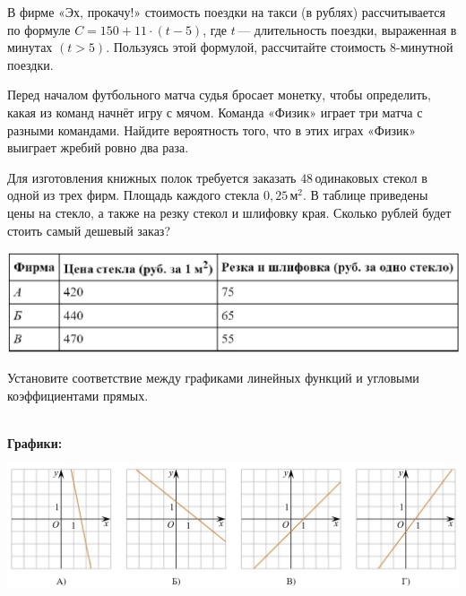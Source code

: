 \begin{training}[1]
\begin{listofex}
\begin{minipage}[t]{\linewidth}
	\end{minipage}
	\item В фирме «Эх, прокачу!» стоимость поездки на такси (в рублях) рассчитывается по формуле \(C=150+11\cdot (t-5)\), где \(t\) --- длительность поездки, выраженная в минутах \((t>5)\). Пользуясь этой формулой, рассчитайте стоимость \(8\)-минутной поездки.
	\item Перед началом футбольного матча судья бросает монетку, чтобы определить, какая из команд начнёт игру с мячом. Команда «Физик» играет три матча с разными командами. Найдите вероятность того, что в этих играх «Физик» выиграет жребий ровно два раза.
	\item 
	\begin{minipage}[t]{\linewidth}
		Для изготовления книжных полок требуется заказать \(48\) одинаковых стекол в одной из трех фирм. Площадь каждого стекла \(0,25\) м\(^2\). В таблице приведены цены на стекло, а также на резку стекол и шлифовку края. Сколько рублей будет стоить самый дешевый заказ?
	\end{minipage}
	\hspace{0.02\linewidth}
	\begin{minipage}[t]{\linewidth}
		\includegraphics[align=t, width=\linewidth]{../pics/G101M8H3-6}
	\end{minipage}
	\item 
	\begin{minipage}[t]{\linewidth}
		Установите соответствие между графиками линейных функций и угловыми коэффициентами прямых.
	\end{minipage}
	\hspace{0.02\linewidth}
	\\
	\textbf{Графики:}
	\\
	\begin{minipage}[t]{\linewidth}
		\includegraphics[align=t, width=\linewidth]{../pics/G101M8L6-3}

\end{minipage}
\end{listofex}
\end{training}
